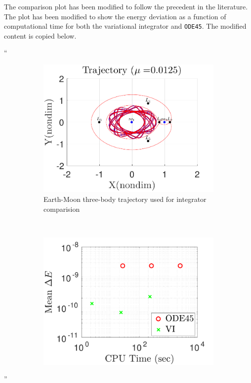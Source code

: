 \documentclass[11pt]{article}
\newenvironment{correction}{\begin{list}{}{\setlength{\leftmargin}{1cm}\setlength{\rightmargin}{1cm}}\vspace{\parsep}\item[]``}{''\end{list}}
\begin{document}
\begin{enumerate}
The comparison plot has been modified to follow the precedent in the literature.
The plot has been modified to show the energy deviation as a function of computational time for both the variational integrator and \texttt{ODE45}.
The modified content is copied below.
\begin{correction}
\begin{figure} 
        \centering 
        \begin{subfigure}[h]{0.5\textwidth} 
                \includegraphics[width=\textwidth]{trajectory} 
                \caption{Earth-Moon three-body trajectory used for integrator comparision}
        \end{subfigure}~ %
        \begin{subfigure}[htbp]{0.5\textwidth} 
                \includegraphics[width=\textwidth]{figures/cputimevsE.pdf} 

\end{subfigure}
\end{figure}
\end{correction}
\end{enumerate}
\end{document}
